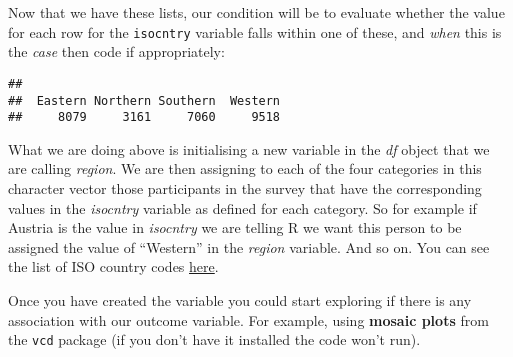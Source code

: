 \documentclass[
]{book}
\newenvironment{Shaded}{\begin{snugshade}}{\end{snugshade}}
\newcommand{\AttributeTok}[1]{\textcolor[rgb]{0.13,0.29,0.53}{#1}}
\newcommand{\FunctionTok}[1]{\textcolor[rgb]{0.13,0.29,0.53}{\textbf{#1}}}
\newcommand{\NormalTok}[1]{#1}
\newcommand{\OtherTok}[1]{\textcolor[rgb]{0.56,0.35,0.01}{#1}}
\newcommand{\SpecialCharTok}[1]{\textcolor[rgb]{0.81,0.36,0.00}{\textbf{#1}}}
\newcommand{\StringTok}[1]{\textcolor[rgb]{0.31,0.60,0.02}{#1}}
\begin{document}
Now that we have these lists, our condition will be to evaluate whether the value for each row for the \texttt{isocntry} variable falls within one of these, and \emph{when} this is the \emph{case} then code if appropriately:

\begin{Shaded}
\end{Shaded}

\begin{verbatim}
## 
##  Eastern Northern Southern  Western 
##     8079     3161     7060     9518
\end{verbatim}

What we are doing above is initialising a new variable in the \emph{df} object that we are calling \emph{region}. We are then assigning to each of the four categories in this character vector those participants in the survey that have the corresponding values in the \emph{isocntry} variable as defined for each category. So for example if Austria is the value in \emph{isocntry} we are telling R we want this person to be assigned the value of ``Western'' in the \emph{region} variable. And so on. You can see the list of ISO country codes \href{https://en.wikipedia.org/wiki/List_of_ISO_3166_country_codes}{here}.

Once you have created the variable you could start exploring if there is any association with our outcome variable. For example, using \textbf{mosaic plots} from the \texttt{vcd} package (if you don't have it installed the code won't run).
\end{document}
